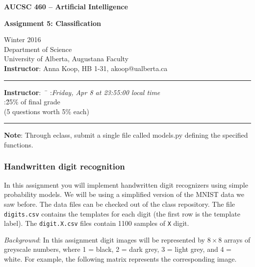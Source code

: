 \documentclass[12pt]{article}
\begin{document}
\noindent
{\Large\bf AUCSC 460 -- Artificial Intelligence}

\vspace*{1\baselineskip}

\noindent
{\large\bf Assignment 5: Classification}

\vspace*{1\baselineskip}

\noindent
Winter 2016\\
Department of Science\\
University of Alberta, Augustana Faculty\\
{\bf Instructor}: Anna Koop, HB 1-31, akoop@ualberta.ca

\vspace*{1.75\baselineskip}
\hrule

\begin{tabbing}
{\bf Instructor}:\ \ \=\kill
{}:\'{\em Friday, Apr 8 at 23:55:00 local time}
\\
:\' 25\% of final grade \\
\>(5 questions worth 5\% each)
\end{tabbing}

\hrule

\vspace*{1.25\baselineskip}

\noindent
{\bf Note}:
Through eclass, submit a single file called models.py defining the specified functions.

\subsubsection*{Handwritten digit recognition}

In this assignment you will implement handwritten digit recognizers using simple probability models.
We will be using a simplified version of the MNIST data we saw before. The data files can be checked out of the class repository. The file {\tt digits.csv} contains the templates for each digit (the first row is the template label). The {\tt digit.X.csv} files contain 1100 samples of {\tt X} digit.

\bigskip

\noindent
{\em Background}:
In this assignment digit images will be represented by $8\times8$
arrays of greyscale numbers, where
1 = black, 2 = dark grey, 3 = light grey, and 4 = white.
For example, the following matrix represents the corresponding image.
\end{document}
